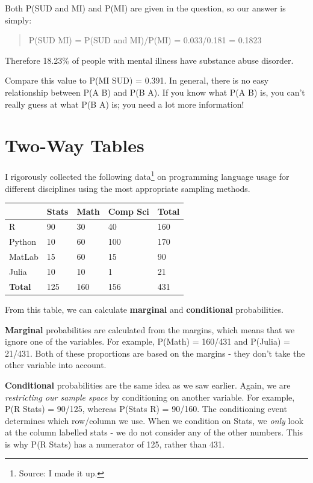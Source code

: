 \documentclass[
  letterpaper,
  DIV=11,
  numbers=noendperiod]{scrreprt}
\begin{document}
Both P(SUD and MI) and P(MI) are given in the question, so our answer is
simply:

\begin{quote}
P(SUD \textbar{} MI) = P(SUD and MI)/P(MI) = 0.033/0.181 = 0.1823
\end{quote}

Therefore 18.23\% of people with mental illness have substance abuse
disorder.

Compare this value to P(MI \textbar{} SUD) = 0.391. In general, there is
no easy relationship between P(A \textbar{} B) and P(B \textbar{} A). If
you know what P(A \textbar{} B) is, you can't really guess at what P(B
\textbar{} A) is; you need a lot more information!

\hypertarget{two-way-tables}{%
\chapter{Two-Way Tables}\label{two-way-tables}}

I rigorously collected the following data\footnote{Source: I made it up.}
on programming language usage for different disciplines using the most
appropriate sampling methods.

\begin{longtable}[]{@{}lllll@{}}
\toprule\noalign{}
& Stats & Math & Comp Sci & Total \\
\midrule\noalign{}
\endhead
\bottomrule\noalign{}
\endlastfoot
R & 90 & 30 & 40 & 160 \\
Python & 10 & 60 & 100 & 170 \\
MatLab & 15 & 60 & 15 & 90 \\
Julia & 10 & 10 & 1 & 21 \\
\textbf{Total} & 125 & 160 & 156 & 431 \\
\end{longtable}

From this table, we can calculate \textbf{marginal} and
\textbf{conditional} probabilities.

\textbf{Marginal} probabilities are calculated from the margins, which
means that we ignore one of the variables. For example, P(Math) =
160/431 and P(Julia) = 21/431. Both of these proportions are based on
the margins - they don't take the other variable into account.

\textbf{Conditional} probabilities are the same idea as we saw earlier.
Again, we are \emph{restricting our sample space} by conditioning on
another variable. For example, P(R \textbar{} Stats) = 90/125, whereas
P(Stats \textbar{} R) = 90/160. The conditioning event determines which
row/column we use. When we condition on Stats, we \emph{only} look at
the column labelled stats - we do not consider any of the other numbers.
This is why P(R \textbar{} Stats) has a numerator of 125, rather than
431.
\end{document}
